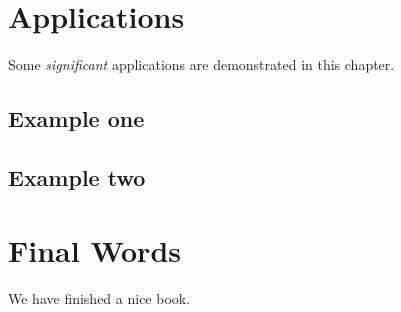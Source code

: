 \documentclass[
]{book}
\theoremstyle{definition}
\theoremstyle{definition}
\theoremstyle{definition}
\theoremstyle{definition}
\theoremstyle{remark}
\begin{document}
\hypertarget{applications}{%
\chapter{Applications}\label{applications}}

Some \emph{significant} applications are demonstrated in this chapter.

\hypertarget{example-one}{%
\section{Example one}\label{example-one}}

\hypertarget{example-two}{%
\section{Example two}\label{example-two}}

\hypertarget{final-words}{%
\chapter{Final Words}\label{final-words}}

We have finished a nice book.

  
\end{document}
